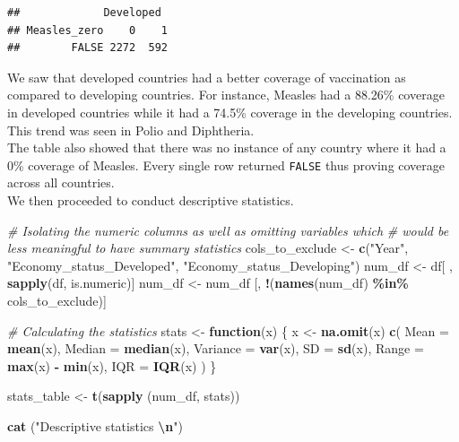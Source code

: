 \documentclass[
  10pt,
]{article}
\newenvironment{Shaded}{\begin{snugshade}}{\end{snugshade}}
\newcommand{\AttributeTok}[1]{\textcolor[rgb]{0.13,0.29,0.53}{#1}}
\newcommand{\CommentTok}[1]{\textcolor[rgb]{0.56,0.35,0.01}{\textit{#1}}}
\newcommand{\ControlFlowTok}[1]{\textcolor[rgb]{0.13,0.29,0.53}{\textbf{#1}}}
\newcommand{\FunctionTok}[1]{\textcolor[rgb]{0.13,0.29,0.53}{\textbf{#1}}}
\newcommand{\NormalTok}[1]{#1}
\newcommand{\OtherTok}[1]{\textcolor[rgb]{0.56,0.35,0.01}{#1}}
\newcommand{\SpecialCharTok}[1]{\textcolor[rgb]{0.81,0.36,0.00}{\textbf{#1}}}
\newcommand{\StringTok}[1]{\textcolor[rgb]{0.31,0.60,0.02}{#1}}
\begin{document}
\begin{verbatim}
##             Developed
## Measles_zero    0    1
##        FALSE 2272  592
\end{verbatim}

We saw that developed countries had a better coverage of vaccination as
compared to developing countries. For instance, Measles had a 88.26\%
coverage in developed countries while it had a 74.5\% coverage in the
developing countries. This trend was seen in Polio and Diphtheria.\\
The table also showed that there was no instance of any country where it
had a 0\% coverage of Measles. Every single row returned \texttt{FALSE}
thus proving coverage across all countries.\\
We then proceeded to conduct descriptive statistics.\\

\begin{Shaded}
\begin{Highlighting}[]
\CommentTok{\# Isolating the numeric columns as well as omitting variables which}
\CommentTok{\# would be less meaningful to have summary statistics}
\NormalTok{cols\_to\_exclude }\OtherTok{\textless{}{-}} \FunctionTok{c}\NormalTok{(}\StringTok{"Year"}\NormalTok{, }\StringTok{"Economy\_status\_Developed"}\NormalTok{, }\StringTok{"Economy\_status\_Developing"}\NormalTok{)}
\NormalTok{num\_df }\OtherTok{\textless{}{-}}\NormalTok{ df[ , }\FunctionTok{sapply}\NormalTok{(df, is.numeric)]}
\NormalTok{num\_df }\OtherTok{\textless{}{-}}\NormalTok{ num\_df [, }\SpecialCharTok{!}\NormalTok{(}\FunctionTok{names}\NormalTok{(num\_df) }\SpecialCharTok{\%in\%}\NormalTok{ cols\_to\_exclude)]}

\CommentTok{\# Calculating the statistics}
\NormalTok{stats }\OtherTok{\textless{}{-}} \ControlFlowTok{function}\NormalTok{(x) \{}
\NormalTok{  x }\OtherTok{\textless{}{-}} \FunctionTok{na.omit}\NormalTok{(x)}
  \FunctionTok{c}\NormalTok{(}
    \AttributeTok{Mean =} \FunctionTok{mean}\NormalTok{(x),}
    \AttributeTok{Median =} \FunctionTok{median}\NormalTok{(x),}
    \AttributeTok{Variance =} \FunctionTok{var}\NormalTok{(x),}
    \AttributeTok{SD =} \FunctionTok{sd}\NormalTok{(x),}
    \AttributeTok{Range =} \FunctionTok{max}\NormalTok{(x) }\SpecialCharTok{{-}} \FunctionTok{min}\NormalTok{(x),}
    \AttributeTok{IQR =} \FunctionTok{IQR}\NormalTok{(x)}
\NormalTok{  )}
\NormalTok{\}}

\NormalTok{stats\_table }\OtherTok{\textless{}{-}} \FunctionTok{t}\NormalTok{(}\FunctionTok{sapply}\NormalTok{ (num\_df, stats))}

\FunctionTok{cat}\NormalTok{ (}\StringTok{"Descriptive statistics }\SpecialCharTok{\textbackslash{}n}\StringTok{"}\NormalTok{)}
\end{Highlighting}
\end{Shaded}
\end{document}
